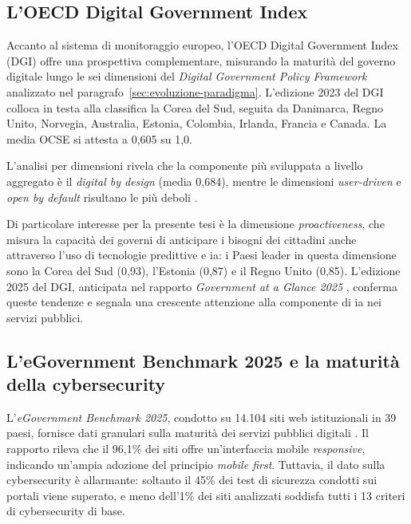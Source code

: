 \subsection{L'OECD Digital Government Index}

Accanto al sistema di monitoraggio europeo, l'OECD Digital Government Index (DGI) offre una prospettiva complementare, misurando la maturità del governo digitale lungo le sei dimensioni del \textit{Digital Government Policy Framework} analizzato nel paragrafo~\ref{sec:evoluzione-paradigma}. L'edizione 2023 del DGI \textcite{OECD_DGI2023} colloca in testa alla classifica la Corea del Sud, seguita da Danimarca, Regno Unito, Norvegia, Australia, Estonia, Colombia, Irlanda, Francia e Canada. La media OCSE si attesta a 0,605 su 1,0.

L'analisi per dimensioni rivela che la componente più sviluppata a livello aggregato è il \textit{digital by design} (media 0,684), mentre le dimensioni \textit{user-driven} e \textit{open by default} risultano le più deboli \parencite{OECD_DGI2023}.

Di particolare interesse per la presente tesi è la dimensione \textit{proactiveness}, che misura la capacità dei governi di anticipare i bisogni dei cittadini anche attraverso l'uso di tecnologie predittive e \gls{ia}: i Paesi leader in questa dimensione sono la Corea del Sud (0,93), l'Estonia (0,87) e il Regno Unito (0,85). L'edizione 2025 del DGI, anticipata nel rapporto \textit{Government at a Glance 2025} \parencite{DGI2025,eGovBenchmarkGovAtGlance2025}, conferma queste tendenze e segnala una crescente attenzione alla componente di \gls{ia} nei servizi pubblici.

\subsection{L'eGovernment Benchmark 2025 e la maturità della cybersecurity}

L'\textit{eGovernment Benchmark 2025}, condotto su 14.104 siti web istituzionali in 39 paesi, fornisce dati granulari sulla maturità dei servizi pubblici digitali \parencite{eGovBenchmark2025}. Il rapporto rileva che il 96,1\% dei siti offre un'interfaccia mobile \textit{responsive}, indicando un'ampia adozione del principio \textit{mobile first}. Tuttavia, il dato sulla cybersecurity è allarmante: soltanto il 45\% dei test di sicurezza condotti sui portali viene superato, e meno dell'1\% dei siti analizzati soddisfa tutti i 13 criteri di cybersecurity di base.

